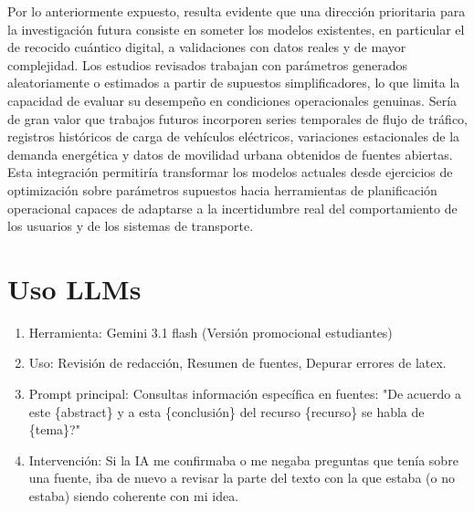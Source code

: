 \documentclass[letter, 10pt]{article}
\begin{document}
Por lo anteriormente expuesto, resulta evidente que una dirección prioritaria para la 
investigación futura consiste en someter los modelos existentes, en particular el de 
recocido cuántico digital, a validaciones con datos reales y de mayor complejidad. 
Los estudios revisados trabajan con parámetros generados aleatoriamente o estimados 
a partir de supuestos simplificadores, lo que limita la capacidad de evaluar su 
desempeño en condiciones operacionales genuinas. Sería de gran valor que trabajos 
futuros incorporen series temporales de flujo de tráfico, registros históricos de 
carga de vehículos eléctricos, variaciones estacionales de la demanda energética y 
datos de movilidad urbana obtenidos de fuentes abiertas. Esta integración permitiría 
transformar los modelos actuales desde ejercicios de optimización sobre parámetros 
supuestos hacia herramientas de planificación operacional capaces de adaptarse a la 
incertidumbre real del comportamiento de los usuarios y de los sistemas de transporte.



\newpage

\section{Uso LLMs}

\begin{enumerate}
    \item Herramienta: Gemini 3.1 flash (Versión promocional estudiantes)
    \item Uso: Revisión de redacción, Resumen de fuentes, Depurar errores de latex.
    \item Prompt principal: Consultas información específica en fuentes: "De acuerdo a este \{abstract\} y a esta \{conclusión\} del recurso \{recurso\} se habla de \{tema\}?"
    \item Intervención: Si la IA me confirmaba o me negaba preguntas que tenía sobre una fuente, iba de nuevo a revisar la parte del texto con la que estaba (o no estaba) siendo coherente con mi idea.
\end{enumerate}



\end{document}
